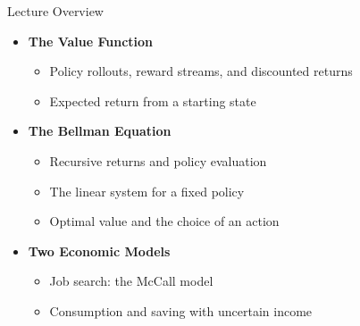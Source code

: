 \newcommand{\ValueMazeRouteB}{%
  \draw[valueFlow,shorten <=2pt,shorten >=2pt] (0.5,3.5) -- (0.5,4.5);
  \draw[valueFlow,shorten <=2pt,shorten >=2pt] (0.5,4.5) -- (0.5,5.5);
  \draw[valueFlow,shorten <=2pt,shorten >=2pt] (0.5,5.5) -- (1.5,5.5);
  \draw[valueFlow,shorten <=2pt,shorten >=2pt] (1.5,5.5) -- (2.5,5.5);
  \draw[valueFlow,shorten <=2pt,shorten >=2pt] (2.5,5.5) -- (3.5,5.5);
  \draw[valueFlow,shorten <=2pt,shorten >=2pt] (3.5,5.5) -- (4.5,5.5);
  \draw[valueFlow,shorten <=2pt,shorten >=2pt] (4.5,5.5) -- (5.5,5.5);
  \draw[valueFlow,shorten <=2pt,shorten >=2pt] (5.5,5.5) -- (6.5,5.5);
  \draw[valueFlow,shorten <=2pt,shorten >=2pt] (6.5,5.5) -- (6.5,4.5);
  \draw[valueFlow,shorten <=2pt,shorten >=2pt] (6.5,4.5) -- (6.5,3.5);
  \draw[valueFlow,shorten <=2pt,shorten >=2pt] (6.5,3.5) -- (6.5,2.5);
  \draw[valueFlow,shorten <=2pt,shorten >=2pt] (6.5,2.5) -- (7.5,2.5);
  \draw[valueFlow,shorten <=2pt,shorten >=2pt] (7.5,2.5) -- (8.5,2.5);
  \draw[valueFlow,shorten <=2pt,shorten >=2pt] (8.5,2.5) -- (8.5,3.5);
  \draw[valueFlow,shorten <=2pt,shorten >=2pt] (8.5,3.5) -- (8.5,4.5);
  \draw[valueFlow,shorten <=2pt,shorten >=2pt] (8.5,4.5) -- (8.5,5.5);
}

\makecoursetitle

\begin{frame}{Lecture Overview}
\begin{itemize}
\item \textbf{The Value Function}
  \begin{itemize}
  \item Policy rollouts, reward streams, and discounted returns
  \item Expected return from a starting state
  \end{itemize}
\item \textbf{The Bellman Equation}
  \begin{itemize}
  \item Recursive returns and policy evaluation
  \item The linear system for a fixed policy
  \item Optimal value and the choice of an action
  \end{itemize}
\item \textbf{Two Economic Models}
  \begin{itemize}
  \item Job search: the McCall model
  \item Consumption and saving with uncertain income
  \end{itemize}
\end{itemize}
\end{frame}

